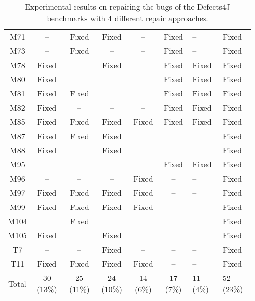\begin{table}[!t]
{\begin{tabular}{|c|c|c|c|c|c|}
M71               & --        & Fixed     & Fixed     & --        & Fixed     & --        &Fixed   \\
M73               & --        & Fixed     & --        & --        & Fixed     & --        &Fixed   \\
M78               & Fixed     & --        & Fixed     & --        & Fixed     & Fixed     &Fixed   \\
M80               & Fixed     & --        & --        & --        & Fixed     & Fixed     &Fixed   \\
M81               & Fixed     & Fixed     & --        & --        & Fixed     & Fixed     &Fixed   \\
M82               & Fixed     & --        & --        & --        & Fixed     & Fixed     &Fixed   \\
M85               & Fixed     & Fixed     & Fixed     & Fixed     & Fixed     & Fixed     &Fixed   \\
M87               & Fixed     & Fixed     & Fixed     & --        & --        & --        &Fixed   \\
M88               & Fixed     & --        & Fixed     & --        & --        & --        &Fixed   \\
M95               & --        & --        & --        & --        & Fixed     & Fixed     &Fixed   \\
M96               & --        & --        & --        & Fixed     & --        & --        &Fixed   \\
M97               & Fixed     & Fixed     & Fixed     & Fixed     & --        & --        &Fixed   \\
M99               & Fixed     & Fixed     & Fixed     & Fixed     & --        & --        &Fixed   \\
M104              & --        & Fixed     & --        & --        & --        & --        &Fixed   \\
M105              & Fixed     & --        & Fixed     & --        & --        & --        &Fixed   \\
\hline
T7                & --        & --        & Fixed     & --        & --        & --        &Fixed   \\
T11               & Fixed     & Fixed     & Fixed     & Fixed     & --        & --        &Fixed   \\
\hline
Total             & 30 (13\%) & 25 (11\%) & 24 (10\%) & 14 (6\%)  & 17 (7\%)  & 11 (4\%)  & 52 (23\%)\\
\hline 
\end{tabular}%
}
\caption{Experimental results on repairing the bugs of the Defects4J benchmarks with 4 different repair approaches.}
\end{table}
